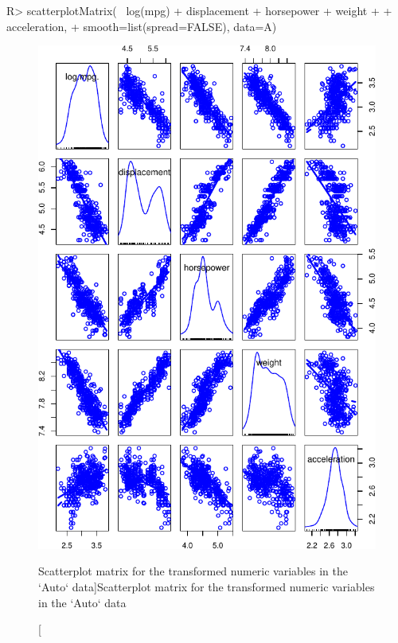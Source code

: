 \documentclass[
]{jss}
\begin{document}
\begin{CodeChunk}
\begin{CodeInput}
R> scatterplotMatrix(~ log(mpg) + displacement + horsepower + weight 
+                   + acceleration, 
+                   smooth=list(spread=FALSE), data=A)
\end{CodeInput}
\begin{figure}

{\centering \includegraphics[width=1\linewidth]{JSS-article-reduced_files/figure-latex/Auto-transformed-scatterplot-matrix-1} 

}

\caption[Scatterplot matrix for the transformed numeric variables in the `Auto` data]{Scatterplot matrix for the transformed numeric variables in the `Auto` data}\label{fig:Auto-transformed-scatterplot-matrix}
\end{figure}
\end{CodeChunk}
\end{document}

